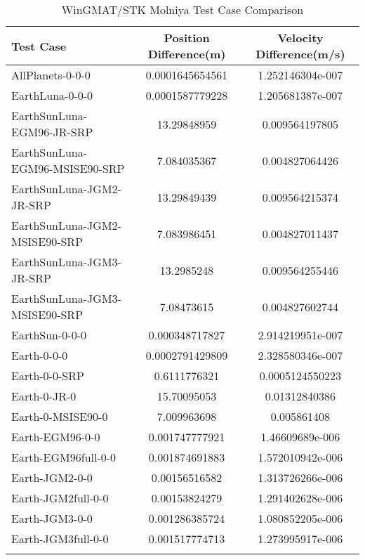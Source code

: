 \begin{table}[htbp!]
\centering
\caption{ WinGMAT/STK Molniya Test Case Comparison}
      \begin{tabular}{lcc}
      \hline\hline
          Test Case & Position Difference(m) & Velocity Difference(m/s) \\
         \hline
         AllPlanets-0-0-0 & 0.0001645654561 & 1.252146304e-007 \\
         EarthLuna-0-0-0 & 0.0001587779228 & 1.205681387e-007 \\
         EarthSunLuna-EGM96-JR-SRP & 13.29848959 & 0.009564197805 \\
         EarthSunLuna-EGM96-MSISE90-SRP & 7.084035367 & 0.004827064426 \\
         EarthSunLuna-JGM2-JR-SRP & 13.29849439 & 0.009564215374 \\
         EarthSunLuna-JGM2-MSISE90-SRP & 7.083986451 & 0.004827011437 \\
         EarthSunLuna-JGM3-JR-SRP & 13.2985248 & 0.009564255446 \\
         EarthSunLuna-JGM3-MSISE90-SRP & 7.08473615 & 0.004827602744 \\
         EarthSun-0-0-0 & 0.000348717827 & 2.914219951e-007 \\
         Earth-0-0-0 & 0.0002791429809 & 2.328580346e-007 \\
         Earth-0-0-SRP & 0.6111776321 & 0.0005124550223 \\
         Earth-0-JR-0 & 15.70095053 & 0.01312840386 \\
         Earth-0-MSISE90-0 & 7.009963698 & 0.005861408 \\
         Earth-EGM96-0-0 & 0.001747777921 & 1.46609689e-006 \\
         Earth-EGM96full-0-0 & 0.001874691883 & 1.572010942e-006 \\
         Earth-JGM2-0-0 & 0.00156516582 & 1.313726266e-006 \\
         Earth-JGM2full-0-0 & 0.00153824279 & 1.291402628e-006 \\
         Earth-JGM3-0-0 & 0.001286385724 & 1.080852205e-006 \\
         Earth-JGM3full-0-0 & 0.001517774713 & 1.273995917e-006 \\
      \hline\hline
      \label{Table: Molniya WinGMAT-STK Table} 
\end{tabular}
\end{table}
